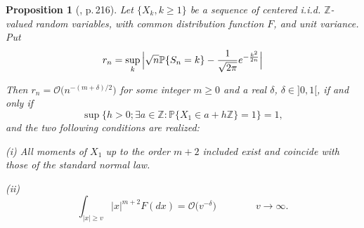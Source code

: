 \documentclass[11pt,draft,reqno]{amsart}
\newtheorem{proposition}[theorem]{Proposition}
\theoremstyle{definition}
\theoremstyle{remarks}
\numberwithin{equation}{section}
\def \d{{\delta}}
\def \qq{{\qquad}}
\def\P{{\mathcal P}}
\def\P{{\mathbb P}}
\def\Z{{\mathbb Z}}
\begin{document}
\begin{proposition}[\cite{P},  p.\,216]\label{llt.indep.ibra.g.moments} Let  $\{X_k, k\ge 1\}$ be a sequence of centered i.i.d. $\Z$-valued random variables, with common distribution function $F$, and unit variance. 
 Put $$r_n= \sup_{k}\Big|  \sqrt n \P\{S_n=k\}-{1\over  \sqrt{ 2\pi}}e^{-  {k^2\over  2 n } }\Big|  $$

Then   $ r_n ={\mathcal O}\big(n^{-(m+\d)/2}\big) $ 
for some integer  $m\ge 0$  and a real $\d$,  $\d\in ]0,1[$, if and only if  $$\sup\big\{h>0; \exists a\in
\Z:
\P\{X_1\in a+h\Z\}=1\big\}= 1,$$  and the two following conditions are realized:
\smallskip\par {\rm (i)} All moments of  $X_1$ up to the order  $m+2$ included exist and coincide with those of the standard normal law.  
\smallskip\par {\rm (ii)}
$$\int_{|x|\ge v}|x|^{m+2} F(dx)={\mathcal O}\big(v^{-\d}\big) \qq  \qq v\to \infty. $$
\end{proposition}
\end{document}
